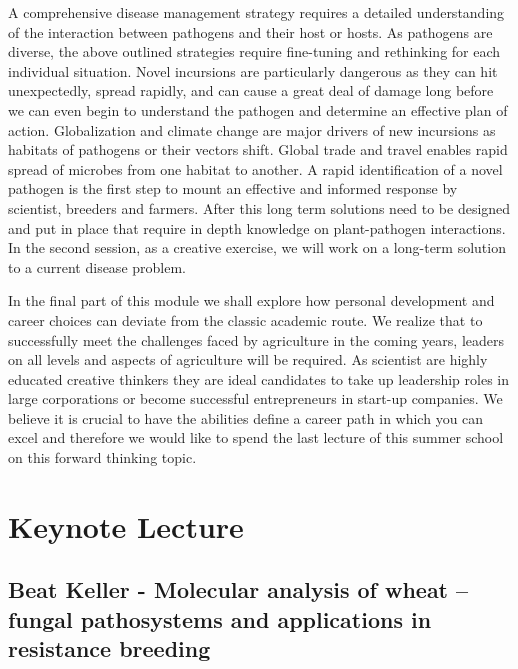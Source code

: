 \documentclass[12pt,]{book}
\theoremstyle{definition}
\theoremstyle{definition}
\theoremstyle{remark}
\begin{document}
A comprehensive disease management strategy requires a detailed
understanding of the interaction between pathogens and their host or
hosts. As pathogens are diverse, the above outlined strategies require
fine-tuning and rethinking for each individual situation. Novel
incursions are particularly dangerous as they can hit unexpectedly,
spread rapidly, and can cause a great deal of damage long before we can
even begin to understand the pathogen and determine an effective plan of
action. Globalization and climate change are major drivers of new
incursions as habitats of pathogens or their vectors shift. Global trade
and travel enables rapid spread of microbes from one habitat to another.
A rapid identification of a novel pathogen is the first step to mount an
effective and informed response by scientist, breeders and farmers.
After this long term solutions need to be designed and put in place that
require in depth knowledge on plant-pathogen interactions. In the second
session, as a creative exercise, we will work on a long-term solution to
a current disease problem.

In the final part of this module we shall explore how personal
development and career choices can deviate from the classic academic
route. We realize that to successfully meet the challenges faced by
agriculture in the coming years, leaders on all levels and aspects of
agriculture will be required. As scientist are highly educated creative
thinkers they are ideal candidates to take up leadership roles in large
corporations or become successful entrepreneurs in start-up companies.
We believe it is crucial to have the abilities define a career path in
which you can excel and therefore we would like to spend the last
lecture of this summer school on this forward thinking topic.

\section*{Keynote Lecture}\label{keynote-lecture-7}

\subsection*{Beat Keller - Molecular analysis of wheat -- fungal
pathosystems and applications in resistance
breeding}\label{beat-keller---molecular-analysis-of-wheat-fungal-pathosystems-and-applications-in-resistance-breeding}
\end{document}
